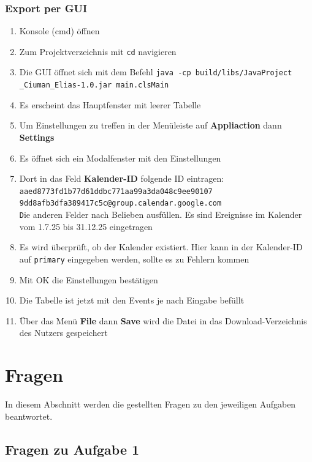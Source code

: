 \documentclass[a4paper]{article}
\begin{document}
	\subsubsection*{Export per GUI}
	\begin{enumerate}
		\item Konsole (cmd) öffnen
		\item Zum Projektverzeichnis mit \texttt{cd} navigieren
		\item Die GUI öffnet sich mit dem Befehl \texttt{java -cp build/libs/JavaProject\\_Ciuman_Elias-1.0.jar main.clsMain}
		\item Es erscheint das Hauptfenster mit leerer Tabelle
		\item Um Einstellungen zu treffen in der Menüleiste auf \textbf{Appliaction} dann \textbf{Settings}
		\item Es öffnet sich ein Modalfenster mit den Einstellungen
		\item Dort in das Feld \textbf{Kalender-ID} folgende ID eintragen: \\ \texttt{aaed8773fd1b77d61ddbc771aa99a3da048c9ee90107\\9dd8afb3dfa389417c5c@group.calendar.google.com}\\
		\texttt Die anderen Felder nach Belieben ausfüllen. Es sind Ereignisse im Kalender vom 1.7.25 bis 31.12.25 eingetragen
		\item Es wird überprüft, ob der Kalender existiert. Hier kann in der Kalender-ID auf \texttt{primary} eingegeben werden, sollte es zu Fehlern kommen
		\item Mit OK die Einstellungen bestätigen
		\item Die Tabelle ist jetzt mit den Events je nach Eingabe befüllt
		\item Über das Menü \textbf{File} dann \textbf{Save} wird die Datei in das Download-Verzeichnis des Nutzers gespeichert
	\end{enumerate}
	
	\section{Fragen}
	In diesem Abschnitt werden die gestellten Fragen zu den jeweiligen Aufgaben beantwortet.
	
	\subsection{Fragen zu Aufgabe 1}
	
\end{document}
